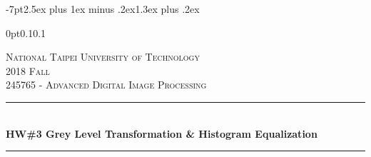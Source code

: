 \titlespacing*{\section} {-7pt}{2.5ex plus 1ex minus .2ex}{1.3ex plus .2ex}

\titlespacing*{\subsection}
{0pt}{0.1\baselineskip}{0.1\baselineskip}




\begin{titlepage} %
	\newcommand{\HRule}{\rule{\linewidth}{0.5mm}} %
		
	\center %
		
		
	\textsc{\LARGE National Taipei University of Technology}\\[1.5cm] %
		
	\textsc{\Large 2018 Fall}\\[0.5cm] %
		
	\textsc{\large 245765 - Advanced Digital Image Processing}\\[0.5cm] %
		
		
	\HRule\\[0.4cm]
		
	{\huge\bfseries HW\#3 Grey Level Transformation \& Histogram Equalization}\\[0.4cm] %
		
	\HRule\\[1.5cm]
		

\end{titlepage}
